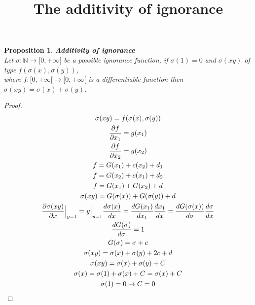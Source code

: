 \documentclass{article}
\title{The additivity of ignorance}
\newtheorem*{prop*}{Proposition}
\newcommand{\bb}[1]{\textbf{#1}}
\newcommand{\N}{\mathbb{N}}
\newcommand{\pder}[2]{\frac{\partial #1}{\partial #2}}
\newcommand{\eval}[1]{\Big{|}_{#1}}
\begin{document}
\maketitle
\begin{prop*}{\bb{Additivity of ignorance}\\}
Let $\sigma :\N\to[0,+\infty[$ be a possible ignorance function, if $\sigma(1)=0$ and $\sigma(xy)$ of type $f(\sigma(x),\sigma(y))$,\\ 
where $f:[0,+\infty[\to[0,+\infty[$ is a differentiable function then $\sigma(xy)=\sigma(x)+\sigma(y)$.
\end{prop*}
\begin{proof}
\begin{gather}
    \sigma(xy)=f(\sigma(x),\sigma(y))\\
    \pder{f}{x_1}=g(x_1)\\
    \pder{f}{x_2}=g(x_2)\\
    f=G(x_1)+c(x_2)+d_1\\
    f=G(x_2)+c(x_1)+d_2\\
    f=G(x_1)+G(x_2)+d\\
    \sigma(xy)=G(\sigma(x))+G(\sigma(y))+d\\
    \pder{\sigma(xy)}{x}\eval{y=1}=y\eval{y=1}\frac{d\sigma(x)}{dx}=\frac{dG(x_1)}{dx_1}\frac{dx_1}{dx}
        =\frac{dG(\sigma(x))}{d\sigma}\frac{d\sigma}{dx}\\
    \frac{dG(\sigma)}{d\sigma}=1\\
    G(\sigma)=\sigma+c\\
    \sigma(xy)=\sigma(x)+\sigma(y)+2c+d\\
    \sigma(xy)=\sigma(x)+\sigma(y)+C\\
    \sigma(x)=\sigma(1)+\sigma(x)+C=\sigma(x)+C\\
    \sigma(1)=0\rightarrow C=0\\
\end{gather}  
\end{proof}
\end{document}

